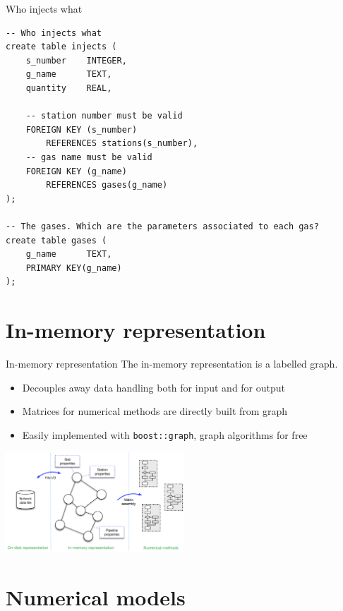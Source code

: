 \documentclass[10pt,aspectratio=169]{beamer}
\begin{document}
\begin{frame}[fragile]{Who injects what}
\begin{verbatim}
-- Who injects what
create table injects (
    s_number    INTEGER,
    g_name      TEXT,
    quantity    REAL,

    -- station number must be valid
    FOREIGN KEY (s_number)
        REFERENCES stations(s_number),
    -- gas name must be valid
    FOREIGN KEY (g_name)
        REFERENCES gases(g_name)
);

-- The gases. Which are the parameters associated to each gas?
create table gases (
    g_name      TEXT,
    PRIMARY KEY(g_name)
);

\end{verbatim}
\end{frame}

\section{In-memory representation}
\begin{frame}{In-memory representation}
    The in-memory representation is a labelled graph.
    \begin{itemize}
        \item Decouples away data handling both for input and for output
        \item Matrices for numerical methods are directly built from graph
        \item Easily implemented with \texttt{boost::graph}, graph algorithms for free
    \end{itemize}

\begin{center}
    \includegraphics[width=0.5\textwidth]{img/system_arch}
\end{center}

\end{frame}
\section{Numerical models}
\end{document}
